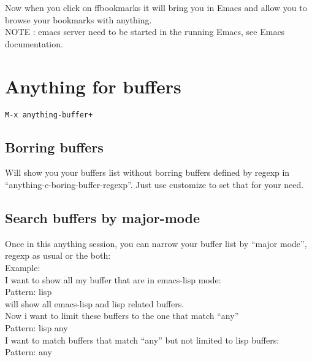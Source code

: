 \documentclass[a4paper,11pt]{article}
\begin{document}
Now when you click on ffbookmarks it will bring you in Emacs and allow
you to browse your bookmarks with anything.
\\
NOTE : emacs server need to be started in the running Emacs, see Emacs
documentation.

\section{Anything for buffers}
\label{sec:anything-buffers}

\begin{verbatim}
M-x anything-buffer+
\end{verbatim}

\subsection{Borring buffers}
\label{sec:borring-buffers}

Will show you your buffers list without borring buffers defined by regexp in
``anything-c-boring-buffer-regexp''.
Just use customize to set that for your need.\\

\subsection{Search buffers by major-mode}
\label{sec:search-buffers-major}


Once in this anything session, you can narrow your buffer list by ``major mode'', regexp as usual or the both:\\

Example:\\

I want to show all my buffer that are in emacs-lisp mode:\\

Pattern: lisp \\

will show all emacs-lisp and lisp related buffers.\\

Now i want to limit these buffers to the one that match ``any''\\

Pattern: lisp any \\
 
I want to match buffers that match ``any'' but not limited to lisp buffers:\\

Pattern: any \\
\end{document}
